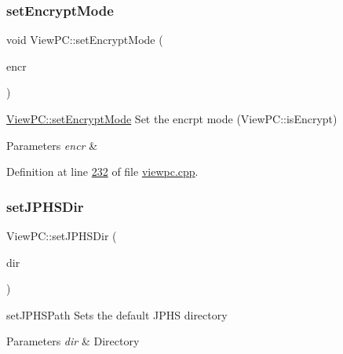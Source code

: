\subsubsection{\texorpdfstring{set\+Encrypt\+Mode}{setEncryptMode}}
{\footnotesize\ttfamily void View\+P\+C\+::set\+Encrypt\+Mode (\begin{DoxyParamCaption}\item[{bool}]{encr }\end{DoxyParamCaption})\hspace{0.3cm}{\ttfamily [slot]}}



\mbox{\hyperlink{class_view_p_c_a5b48951efefdc0e3039c9a4bf185320b}{View\+P\+C\+::set\+Encrypt\+Mode}} Set the encrpt mode (View\+P\+C\+::is\+Encrypt) 


\begin{DoxyParams}{Parameters}
{\em encr} & \\
\hline
\end{DoxyParams}


Definition at line \mbox{\hyperlink{viewpc_8cpp_source_l00232}{232}} of file \mbox{\hyperlink{viewpc_8cpp_source}{viewpc.\+cpp}}.

\mbox{\label{class_view_p_c_ababceedc355ecc1217a4c708e19e5e6b}} 
\subsubsection{\texorpdfstring{set\+J\+P\+H\+S\+Dir}{setJPHSDir}}
{\footnotesize\ttfamily View\+P\+C\+::set\+J\+P\+H\+S\+Dir (\begin{DoxyParamCaption}\item[{Q\+String}]{dir }\end{DoxyParamCaption})\hspace{0.3cm}{\ttfamily [signal]}}



set\+J\+P\+H\+S\+Path Sets the default J\+P\+HS directory 


\begin{DoxyParams}{Parameters}
{\em dir} & Directory \\
\hline
\end{DoxyParams}
\mbox{\label{class_view_p_c_a9c32a1fdb6ead84e5ada8fba8860c7ed}} 
